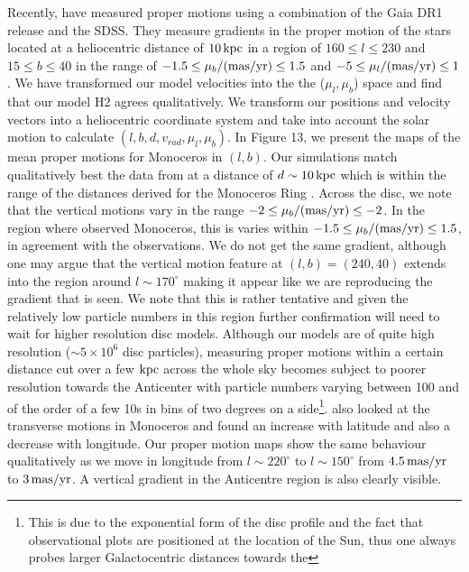 \documentclass[useAMS,usenatbib]{mnras}
\begin{document}
Recently, \cite{deboer17} have measured proper motions using a combination of the Gaia DR1 release and the SDSS. They measure gradients in the proper motion of the stars located at a heliocentric distance of $10\,\rm{kpc}$ in a region of $160\leq l\leq230$ and $15\leq b\leq40$ in the range of $-1.5\leq\mu_{b}/(\rm{mas/yr})\leq1.5$ and $-5\leq\mu_{l}/(\rm{mas/yr})\leq1$. We have transformed our model velocities into the the ($\mu_{l}, \mu_{b}$) space and find that our model H2 agrees qualitatively. We transform our positions and velocity vectors into a heliocentric coordinate system and take into account the solar motion to calculate $(l,b,d, v_{rad}, \mu_{l}, \mu_{b})$. In Figure 13, we present the maps of the mean proper motions for Monoceros in $(l,b)$. Our simulations match qualitatively best the data from \cite{deboer17} at a distance of $d\sim10\,\rm{kpc}$ which is within the range of the distances derived for the Monoceros Ring \citep{ibata03,slater14,morganson16}. Across the disc, we note that the vertical motions vary in the range  $-2\leq\mu_{b}/(\rm{mas/yr})\leq-2$.  In the region where \cite{deboer17} observed Monoceros, this is varies within $-1.5 \leq \mu_{b}/(\rm{mas/yr}) \leq 1.5$, in agreement with the observations. We do not get the same gradient, although one may argue that the vertical motion feature at $(l,b)=(240,40)$ extends into the region around $l\sim170^{\circ}$ making it appear like we are reproducing the gradient that is seen. We note that this is rather tentative and given the relatively low particle numbers in this region further confirmation will need to wait for higher resolution disc models.  Although our models are of quite high resolution ($\sim 5 \times 10^{6}$ disc particles), measuring proper motions within a certain distance cut over a few $\rm{kpc}$ across the whole sky becomes subject to poorer resolution towards the Anticenter with particle numbers varying between 100 and of the order of a few 10s in bins of two degrees on a side\footnote{This is due to the exponential form of the disc profile and the fact that observational plots are positioned at the location of the Sun, thus one always probes larger Galactocentric distances towards the}. \cite{deboer17} also looked at the transverse motions in Monoceros and found an increase with latitude and also a decrease with longitude. Our proper motion maps show the same behaviour qualitatively as we move in longitude from $l\sim220^{\circ}$ to $l\sim150^{\circ}$ from $4.5\,\rm{mas/yr}$ to $3 \,\rm{mas/yr}$. A vertical gradient in the Anticentre region is also clearly visible.
\end{document}
